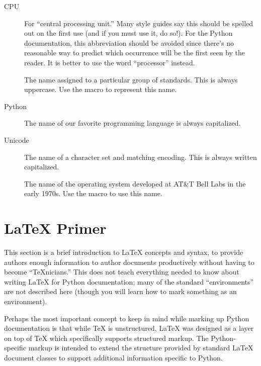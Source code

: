 \documentclass{howto}
\begin{document}
  \begin{description}
    \item[CPU]
    For ``central processing unit.''  Many style guides say this
    should be spelled out on the first use (and if you must use it,
    do so!).  For the Python documentation, this abbreviation should
    be avoided since there's no reasonable way to predict which occurrence
    will be the first seen by the reader.  It is better to use the
    word ``processor'' instead.

    \item[\POSIX]
        The name assigned to a particular group of standards.  This is
        always uppercase.  Use the macro  to represent this
        name.

    \item[Python]
        The name of our favorite programming language is always
        capitalized.

    \item[Unicode]
        The name of a character set and matching encoding.  This is
        always written capitalized.

    \item[\UNIX]
        The name of the operating system developed at AT\&T Bell Labs
        in the early 1970s.  Use the macro  to use this
        name.
  \end{description}


\section{\LaTeX{} Primer \label{latex-primer}}

  This section is a brief introduction to \LaTeX{} concepts and
  syntax, to provide authors enough information to author documents
  productively without having to become ``\TeX{}nicians.''  This does
  not teach everything needed to know about writing \LaTeX{} for
  Python documentation; many of the standard ``environments'' are not
  described here (though you will learn how to mark something as an
  environment).

  Perhaps the most important concept to keep in mind while marking up
  Python documentation is that while \TeX{} is unstructured, \LaTeX{} was
  designed as a layer on top of \TeX{} which specifically supports
  structured markup.  The Python-specific markup is intended to extend
  the structure provided by standard \LaTeX{} document classes to
  support additional information specific to Python.
\end{document}
